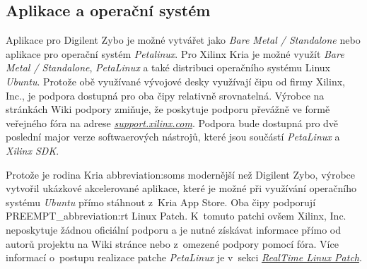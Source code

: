 \documentclass[a4paper, twoside, 11pt]{article}
\begin{document}
			\subsection{Aplikace a operační systém}\label{subsec:aplikace-a-operacni-system}
				Aplikace pro Digilent Zybo je možné vytvářet jako \textit{Bare Metal / Standalone} nebo aplikace pro operační systém \textit{Petalinux}. Pro Xilinx Kria je možné využít \textit{Bare Metal / Standalone}, \textit{PetaLinux} a také distribuci operačního systému Linux \textit{Ubuntu}. Protože obě využívané vývojové desky využívají čipu od firmy Xilinx, Inc., je podpora dostupná pro oba čipy relativně srovnatelná. Výrobce na stránkách Wiki podpory zmiňuje, že poskytuje podporu převážně ve formě veřejného fóra na adrese \href{https://support.xilinx.com}{\textit{support.xilinx.com}}. Podpora bude dostupná pro dvě poslední major verze softwaerových nástrojů, které jsou součástí \textit{PetaLinux} a \textit{Xilinx SDK}. \cite{xilinx-wiki-atlassian-embedded-sw-support}\par
				Protože je rodina Kria \gls{abbreviation:soms} modernější než Digilent Zybo, výrobce vytvořil ukázkové akcelerované aplikace, které je možné při využívání operačního systému \textit{Ubuntu} přímo stáhnout z~Kria App Store. \cite{xilinx-appstore-for-kria-soms}
				Oba čipy podporují PREEMPT\_\gls{abbreviation:rt} Linux Patch. K~tomuto patchi ovšem Xilinx, Inc. neposkytuje žádnou oficiální podporu a je nutné získávat informace přímo od autorů projektu na Wiki stránce \cite{wiki-linux-foundation-real-time-linux} nebo z~omezené podpory pomocí fóra. Více informací o~postupu realizace patche \textit{PetaLinux} je v~sekci \hyperref[subsec:real-time-linux-patch]{\textit{RealTime Linux Patch}}.
\end{document}
